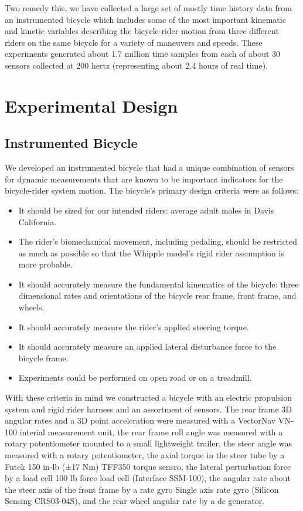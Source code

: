 \documentclass[a4paper]{article}
\begin{document}
Two remedy this, we have collected a large set of mostly time history data from
an instrumented bicycle which includes some of the most important kinematic and
kinetic variables describing the bicycle-rider motion from three different
riders on the same bicycle for a variety of maneuvers and speeds. These
experiments generated about 1.7 million time samples from each of about 30
sensors collected at 200 hertz (representing about 2.4 hours of real time).

\section{Experimental Design}

\subsection{Instrumented Bicycle}
We developed an instrumented bicycle that had a unique combination of sensors
for dynamic measurements that are known to be important indicators for the
bicycle-rider system motion. The bicycle's primary design criteria were as
follows:

\begin{itemize}
  \item It should be sized for our intended riders: average adult males in
    Davis California.
  \item The rider's biomechanical movement, including pedaling, should be
    restricted as much as possible so that the Whipple model's rigid rider
    assumption is more probable.
  \item It should accurately measure the fundamental kinematics of the bicycle:
    three dimensional rates and orientations of the bicycle rear frame, front
    frame, and wheels.
  \item It should accurately measure the rider's applied steering torque.
  \item It should accurately measure an applied lateral disturbance force to
    the bicycle frame.
  \item Experiments could be performed on open road or on a treadmill.
\end{itemize}

With these criteria in mind we constructed a bicycle with an electric
propulsion system and rigid rider harness and an assortment of sensors. The
rear frame 3D angular rates and a 3D point acceleration were measured with a
VectorNav VN-100 interial measurement unit, the rear frame roll angle was
measured with a rotary potentiometer mounted to a small lightweight trailer,
the steer angle was measured with a rotary potentiometer, the axial torque in
the steer tube by a Futek 150 in-lb (±17 Nm) TFF350 torque sensro, the lateral
perturbation force by a load cell 100 lb force load cell (Interface SSM-100),
the angular rate about the steer axis of the front frame by a rate gyro Single
axis rate gyro (Silicon Sensing CRS03-04S), and the rear wheel angular rate by
a dc generator.
\end{document}
